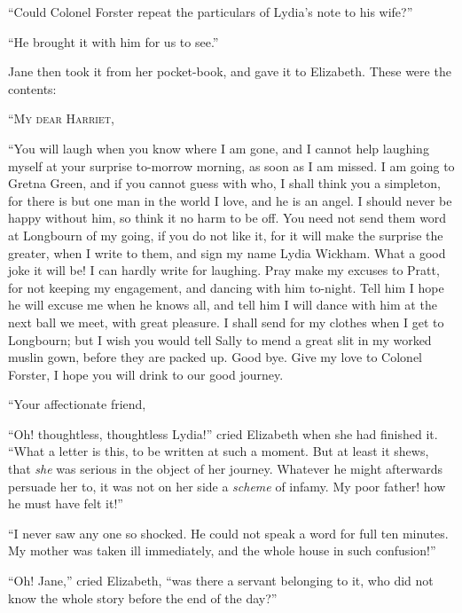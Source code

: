 “Could Colonel Forster repeat the particulars of Lydia’s
note to his wife?”

“He brought it with him for us to see.”

Jane then took it from her pocket-book, and gave it
to Elizabeth. These were the contents:

\begin{letter}
“\textsc{My dear Harriet},

“You will laugh when you know where I am gone,
and I cannot help laughing myself at your surprise to-morrow
morning, as soon as I am missed. I am going to
Gretna Green, and if you cannot guess with who, I shall
think you a simpleton, for there is but one man in the
world I love, and he is an angel. I should never be happy
without him, so think it no harm to be off. You need
not send them word at Longbourn of my going, if you
do not like it, for it will make the surprise the greater,
when I write to them, and sign my name Lydia Wickham.
What a good joke it will be! I can hardly write for
laughing. Pray make my excuses to Pratt, for not keeping
my engagement, and dancing with him to-night. Tell
him I hope he will excuse me when he knows all, and tell
him I will dance with him at the next ball we meet, with
great pleasure. I shall send for my clothes when I get
to Longbourn; but I wish you would tell Sally to mend
a great slit in my worked muslin gown, before they are
packed up. Good bye. Give my love to Colonel Forster,
I hope you will drink to our good journey.

“Your affectionate friend,

\end{letter}

\begin{sloppypar}
“Oh! thoughtless, thoughtless Lydia!” cried Elizabeth
when she had finished it. “What a letter is this,
to be written at such a moment. But at least it shews,
that \textit{she} was serious in the object of her journey. Whatever
he might afterwards persuade her to, it was not on her
side a \textit{scheme} of infamy. My poor father! how he must
have felt it!”
\end{sloppypar}

“I never saw any one so shocked. He could not speak
a word for full ten minutes. My mother was taken ill
immediately, and the whole house in such confusion!”

“Oh! Jane,” cried Elizabeth, “was there a servant
belonging to it, who did not know the whole story before
the end of the day?”

